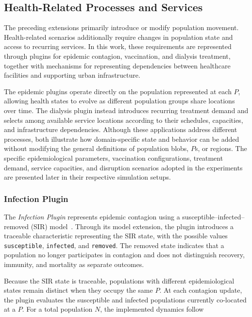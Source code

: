 \subsection{Health-Related Processes and Services}
\label{sec:health_processes_services}

The preceding extensions primarily introduce or modify population movement. Health-related scenarios additionally require changes in population state and access to recurring services. In this work, these requirements are represented through plugins for epidemic contagion, vaccination, and dialysis treatment, together with mechanisms for representing dependencies between healthcare facilities and supporting urban infrastructure.

The epidemic plugins operate directly on the population represented at each $P$, allowing health states to evolve as different population groups share locations over time. The dialysis plugin instead introduces recurring treatment demand and selects among available service locations according to their schedules, capacities, and infrastructure dependencies. 
Although these applications address different processes, both illustrate how domain-specific state and behavior can be added without modifying the general definitions of population blobs, $P$s, or regions. The specific epidemiological parameters, vaccination configurations, treatment demand, service capacities, and disruption scenarios adopted in the experiments are presented later in their respective simulation setups.

\subsubsection{Infection Plugin}
\label{sec:infection_plugin_inputs}

The \textit{Infection Plugin} represents epidemic contagion using a susceptible--infected--removed (SIR) model~\cite{kermack1927contribution}. Through its model extension, the plugin introduces a traceable characteristic representing the SIR state, with the possible values \texttt{susceptible}, \texttt{infected}, and \texttt{removed}. The removed state indicates that a population no longer participates in contagion and does not distinguish recovery, immunity, and mortality as separate outcomes.

Because the SIR state is traceable, populations with different epidemiological states remain distinct when they occupy the same $P$. At each contagion update, the plugin evaluates the susceptible and infected populations currently co-located at a $P$. For a total population $N$, the implemented dynamics follow

